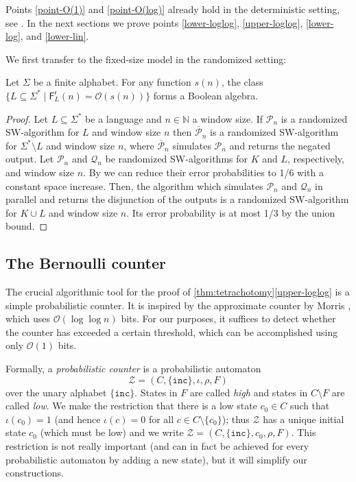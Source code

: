 \documentclass{theoretics}
\newcommand{\N}{\mathbb{N}}
\renewcommand{\O}{\mathcal{O}}
\renewcommand{\P}{\mathcal{P}}
\newcommand{\Q}{\mathcal{Q}}
\newcommand{\BZ}{\mathcal{Z}}
\newcommand{\F}{\mathsf{F}}
\renewcommand{\r}{\mathsf{r}}
\begin{document}
Points \ref{point-O(1)} and \ref{point-O(log)} already hold in the deterministic setting,
see .
In the next sections we prove points \ref{lower-loglog}, \ref{upper-loglog}, \ref{lower-log},
and \ref{lower-lin}.

We first transfer  to the fixed-size model in the randomized setting:
\begin{lemma}\label{thm:randombool}
        Let $\Sigma$ be a finite alphabet.
	For any function $s(n)$, the class $\{ L \subseteq \Sigma^* \mid \F^\r_L(n) = \O(s(n)) \}$
	forms a Boolean algebra.
\end{lemma}

\begin{proof}
       Let $L \subseteq \Sigma^*$ be a language and $n \in \N$ a window size.
	If $\P_n$ is a randomized SW-algorithm for $L$ and window size $n$ then $\overline{\P}_n$ is a randomized SW-algorithm for $\Sigma^* \setminus L$ and window size $n$,
	where $\overline{\P}_n$ simulates $\P_n$ and returns the negated output.
	Let $\P_n$ and $\Q_n$ be randomized SW-algorithms for $K$ and $L$, respectively, and window size $n$.
	By  we can reduce their error probabilities to 1/6 with a constant space increase.
	Then, the algorithm which simulates $\P_n$ and $\Q_n$ in parallel and returns the disjunction of the outputs
	is a randomized SW-algorithm for $K \cup L$ and window size $n$.
	Its error probability is at most 1/3 by the union bound.
\end{proof}

 
 

\subsection{The Bernoulli counter} \label{sec-bernoulli}

The crucial algorithmic tool for the proof of \cref{thm:tetrachotomy}\ref{upper-loglog} is 
a simple probabilistic counter. It is inspired by the approximate counter by Morris \cite{Flajolet85,Morris78a},
which uses $\O(\log \log n)$ bits.
For our purposes, it suffices to detect whether the counter has exceeded a certain threshold,
which can be accomplished using only $\O(1)$ bits.

Formally, a {\em probabilistic counter} is a probabilistic automaton 
\[  \BZ = (C,\{\mathtt{inc}\},\iota,\rho,F) \]
over the unary alphabet $\{\mathtt{inc}\}$. 
States in $F$ are called {\em high} and states in $C \setminus F$ are called {\em low}.
We make the restriction that there is a low state $c_0 \in C$ such that
$\iota(c_0) = 1$ (and hence $\iota(c)=0$ for all $c \in C \setminus \{c_0\}$); thus
$\BZ$ has a unique initial state $c_0$ (which must be low) and we write $\BZ = (C,\{\mathtt{inc}\},c_0,\rho,F)$.
This restriction is not really important (and can in fact be achieved for every 
probabilistic automaton by adding a new state), but it will simplify our constructions.
\end{document}
